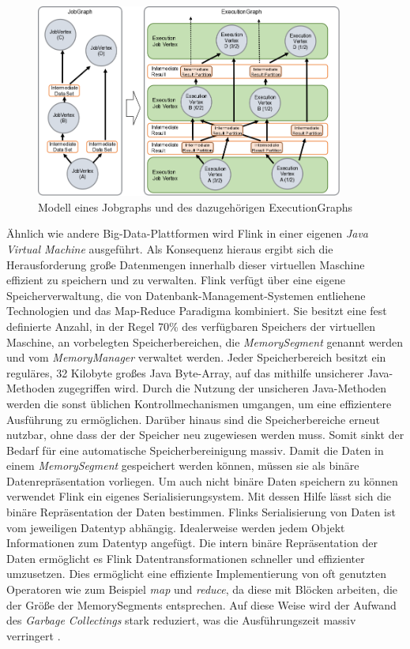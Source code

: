 \begin{figure}[h]
	\centering
	\includegraphics[width=0.9\textwidth]{picture/flink_job_and_execution_graph.png}
	\caption{Modell eines Jobgraphs und des dazugehörigen ExecutionGraphs}
\end{figure}

Ähnlich wie andere Big-Data-Plattformen wird Flink in einer eigenen \textit{Java Virtual Machine} ausgeführt. Als Konsequenz hieraus ergibt sich die Herausforderung große Datenmengen innerhalb dieser virtuellen Maschine effizient zu speichern und zu verwalten. Flink verfügt über eine eigene Speicherverwaltung, die von Datenbank-Management-Systemen entliehene Technologien und das Map-Reduce Paradigma kombiniert. Sie besitzt eine fest definierte Anzahl, in der Regel 70\% des verfügbaren Speichers der virtuellen Maschine, an vorbelegten Speicherbereichen, die \textit{MemorySegment} genannt werden und vom \textit{MemoryManager} verwaltet werden. Jeder Speicherbereich besitzt ein reguläres, 32 Kilobyte großes Java Byte-Array, auf das mithilfe unsicherer Java-Methoden zugegriffen wird. Durch die Nutzung der unsicheren Java-Methoden werden die sonst üblichen Kontrollmechanismen umgangen, um eine effizientere Ausführung zu ermöglichen. Darüber hinaus sind die Speicherbereiche erneut nutzbar, ohne dass der der Speicher neu zugewiesen werden muss. Somit sinkt der Bedarf für eine automatische Speicherbereinigung massiv. Damit die Daten in einem \textit{MemorySegment} gespeichert werden können, müssen sie als binäre Datenrepräsentation vorliegen. Um auch nicht binäre Daten speichern zu können verwendet Flink ein eigenes Serialisierungsystem. Mit dessen Hilfe lässt sich die binäre Repräsentation der Daten bestimmen. Flinks Serialisierung von Daten ist vom jeweiligen Datentyp abhängig. Idealerweise werden jedem Objekt Informationen zum Datentyp angefügt. Die intern binäre Repräsentation der Daten ermöglicht es Flink Datentransformationen schneller und effizienter umzusetzen. Dies ermöglicht eine effiziente Implementierung von oft genutzten Operatoren wie zum Beispiel \textit{map} und \textit{reduce}, da diese mit Blöcken arbeiten, die der Größe der MemorySegments entsprechen. Auf diese Weise wird der Aufwand des \textit{Garbage Collectings} stark reduziert, was die Ausführungszeit massiv verringert \cite{Hueske2015}.


